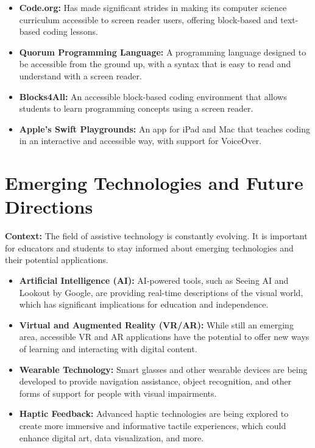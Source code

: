 \begin{itemize}
	\item \textbf{Code.org:} Has made significant strides in making its computer science curriculum accessible to screen reader users, offering block-based and text-based coding lessons.
	\item \textbf{Quorum Programming Language:} A programming language designed to be accessible from the ground up, with a syntax that is easy to read and understand with a screen reader.
	\item \textbf{Blocks4All:} An accessible block-based coding environment that allows students to learn programming concepts using a screen reader.
	\item \textbf{Apple's Swift Playgrounds:} An app for iPad and Mac that teaches coding in an interactive and accessible way, with support for VoiceOver.
\end{itemize}

\section{Emerging Technologies and Future Directions}\label{app4:emerging-tech}

\noindent
\textbf{Context:} The field of assistive technology is constantly evolving. It is important for educators and students to stay informed about emerging technologies and their potential applications.

\begin{itemize}
	\item \textbf{Artificial Intelligence (AI):} AI-powered tools, such as Seeing AI and Lookout by Google, are providing real-time descriptions of the visual world, which has significant implications for education and independence.
	\item \textbf{Virtual and Augmented Reality (VR/AR):} While still an emerging area, accessible VR and AR applications have the potential to offer new ways of learning and interacting with digital content.
	\item \textbf{Wearable Technology:} Smart glasses and other wearable devices are being developed to provide navigation assistance, object recognition, and other forms of support for people with visual impairments.
	\item \textbf{Haptic Feedback:} Advanced haptic technologies are being explored to create more immersive and informative tactile experiences, which could enhance digital art, data visualization, and more.
\end{itemize}
